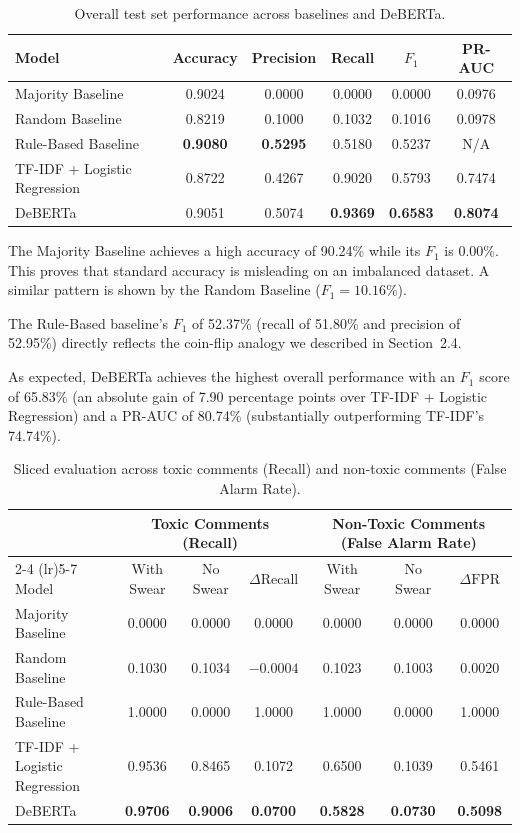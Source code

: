 \documentclass[11pt]{article}
\begin{document}
\begin{table}[t]
  \centering
  \caption{Overall test set performance across baselines and DeBERTa.}
  \label{tab:overall_results}
  \begin{tabular}{lccccc}
    \toprule
    Model & Accuracy & Precision & Recall & $F_1$ & PR-AUC \\
    \midrule
    Majority Baseline & 0.9024 & 0.0000 & 0.0000 & 0.0000 & 0.0976 \\
    Random Baseline & 0.8219 & 0.1000 & 0.1032 & 0.1016 & 0.0978 \\
    Rule-Based Baseline & \textbf{0.9080} & \textbf{0.5295} & 0.5180
    & 0.5237 & N/A \\
    TF-IDF + Logistic Regression & 0.8722 & 0.4267 & 0.9020 & 0.5793 & 0.7474 \\
    DeBERTa & 0.9051 & 0.5074 & \textbf{0.9369} &
    \textbf{0.6583} & \textbf{0.8074} \\
    \bottomrule
  \end{tabular}
\end{table}

The Majority Baseline achieves a high accuracy of 90.24\% while its
$F_1$ is 0.00\%. This proves that standard accuracy is misleading on
an imbalanced dataset. A similar pattern is shown by the Random
Baseline ($F_1 = 10.16\%$).

The Rule-Based baseline's $F_1$ of 52.37\% (recall of 51.80\% and
precision of 52.95\%) directly reflects the coin-flip analogy we
described in Section~2.4.

As expected, DeBERTa achieves the highest overall performance with an
$F_1$ score of 65.83\% (an absolute gain of 7.90 percentage points over
TF-IDF + Logistic Regression) and a PR-AUC of 80.74\% (substantially
outperforming TF-IDF's 74.74\%).

\begin{table}[t]
  \centering
  \caption{Sliced evaluation across toxic comments (Recall) and
  non-toxic comments (False Alarm Rate).}
  \label{tab:slice_results}
  \small
  \begin{tabular}{lcccccc}
    \toprule
    & \multicolumn{3}{c}{\textbf{Toxic Comments (Recall)}} &
    \multicolumn{3}{c}{\textbf{Non-Toxic Comments (False Alarm Rate)}} \\
    \cmidrule(lr){2-4} \cmidrule(lr){5-7}
    Model & With Swear & No Swear & $\Delta\text{Recall}$ & With
    Swear & No Swear & $\Delta\text{FPR}$ \\
    \midrule
    Majority Baseline & 0.0000 & 0.0000 & 0.0000 & 0.0000 & 0.0000 & 0.0000 \\
    Random Baseline & 0.1030 & 0.1034 & $-0.0004$ & 0.1023 & 0.1003 & 0.0020 \\
    Rule-Based Baseline & 1.0000 & 0.0000 & 1.0000 & 1.0000 & 0.0000 & 1.0000 \\
    TF-IDF + Logistic Regression & 0.9536 & 0.8465 & 0.1072 & 0.6500
    & 0.1039 & 0.5461 \\
    DeBERTa & \textbf{0.9706} & \textbf{0.9006} & \textbf{0.0700} &
    \textbf{0.5828} & \textbf{0.0730} & \textbf{0.5098} \\
    \bottomrule
  \end{tabular}
\end{table}
\end{document}
